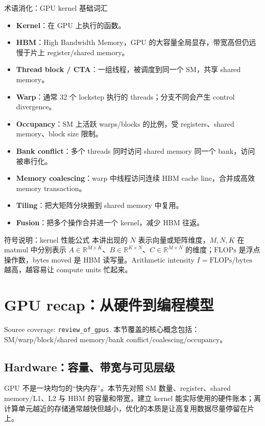 \documentclass[a4paper]{article}
\begin{document}
\begin{knowledgebox}{术语消化：GPU kernel 基础词汇}
\begin{itemize}
    \item \textbf{Kernel}：在 GPU 上执行的函数。
    \item \textbf{HBM}：High Bandwidth Memory，GPU 的大容量全局显存，带宽高但仍远慢于片上 register/shared memory。
    \item \textbf{Thread block / CTA}：一组线程，被调度到同一个 SM，共享 shared memory。
    \item \textbf{Warp}：通常 32 个 lockstep 执行的 threads；分支不同会产生 control divergence。
    \item \textbf{Occupancy}：SM 上活跃 warps/blocks 的比例，受 registers、shared memory、block size 限制。
    \item \textbf{Bank conflict}：多个 threads 同时访问 shared memory 同一个 bank，访问被串行化。
    \item \textbf{Memory coalescing}：warp 中线程访问连续 HBM cache line，合并成高效 memory transaction。
    \item \textbf{Tiling}：把大矩阵分块搬到 shared memory 中复用。
    \item \textbf{Fusion}：把多个操作合并进一个 kernel，减少 HBM 往返。
\end{itemize}
\end{knowledgebox}

\begin{knowledgebox}{符号说明：kernel 性能公式}
本讲出现的 \(N\) 表示向量或矩阵维度，\(M,N,K\) 在 matmul 中分别表示 \(A\in\mathbb{R}^{M\times K}\)、\(B\in\mathbb{R}^{K\times N}\)、\(C\in\mathbb{R}^{M\times N}\) 的维度；\(\mathrm{FLOPs}\) 是浮点操作数，bytes moved 是 HBM 读写量。Arithmetic intensity \(I=\mathrm{FLOPs}/\mathrm{bytes}\) 越高，越容易让 compute units 忙起来。
\end{knowledgebox}
\section{GPU recap：从硬件到编程模型}

Source coverage: \texttt{review\_of\_gpus}. 本节覆盖的核心概念包括：SM/warp/block/shared memory/bank conflict/coalescing/occupancy。

\subsection{Hardware：容量、带宽与可见层级}

GPU 不是一块均匀的“快内存”。本节先对照 SM 数量、register、shared memory/L1、L2 与 HBM 的容量和带宽，建立 kernel 能实际使用的硬件账本；离计算单元越近的存储通常越快但越小，优化的本质是让高复用数据尽量停留在片上。
\end{document}
